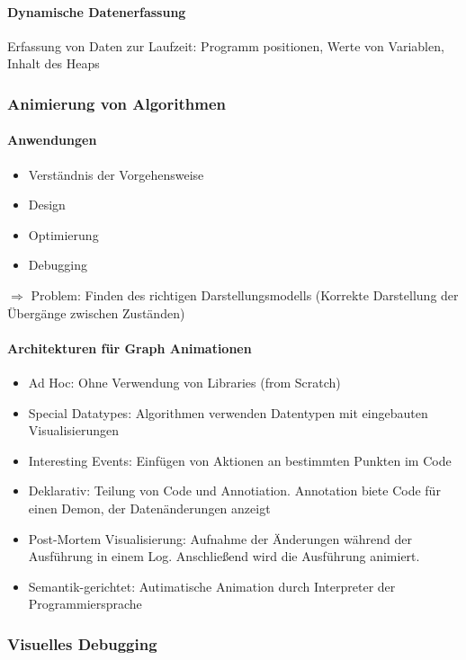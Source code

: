 \documentclass[ngerman]{scrartcl}
\begin{document}
\paragraph{Dynamische Datenerfassung} Erfassung von Daten zur Laufzeit: Programm positionen, Werte von Variablen, Inhalt des Heaps


\subsubsection{Animierung von Algorithmen}
\paragraph{Anwendungen}
\begin{itemize}
  \item Verständnis der Vorgehensweise
  \item Design
  \item Optimierung
  \item Debugging
\end{itemize}
$ \Rightarrow $ Problem: Finden des richtigen Darstellungsmodells (Korrekte Darstellung der Übergänge zwischen Zuständen)

\paragraph{Architekturen für Graph Animationen}
\begin{itemize}
  \item Ad Hoc: Ohne Verwendung von Libraries (from Scratch)
  \item Special Datatypes: Algorithmen verwenden Datentypen mit eingebauten Visualisierungen
  \item Interesting Events: Einfügen von Aktionen an bestimmten Punkten im Code
  \item Deklarativ: Teilung von Code und Annotiation. Annotation biete Code für einen Demon, der Datenänderungen anzeigt 
  \item Post-Mortem Visualisierung: Aufnahme der Änderungen während der Ausführung in einem Log. Anschließend wird die Ausführung animiert.
  \item Semantik-gerichtet: Autimatische Animation durch Interpreter der Programmiersprache
\end{itemize}

\subsubsection{Visuelles Debugging}
\end{document}
